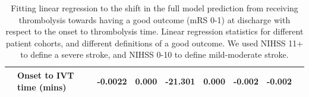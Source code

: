 \begin{table}[!ht]
\begin{tabular}{lllllllll}
$$        & Onset to IVT time (mins) &  -0.0022 &   0.000 & -21.301 & 0.000 & -0.002 & -0.002\\
        \bottomrule
        \end{tabular}
      \label{fig:stats_table_mrs1_full_model_prediction}
    \caption{Fitting linear regression to the shift in the full model prediction from receiving thrombolysis towards having a good outcome (mRS 0-1) at discharge with respect to the onset to thrombolysis time. Linear regression statistics for different patient cohorts, and different definitions of a good outcome. We used NIHSS 11+ to define a severe stroke, and NIHSS 0-10 to define mild-moderate stroke.}
\end{table}




